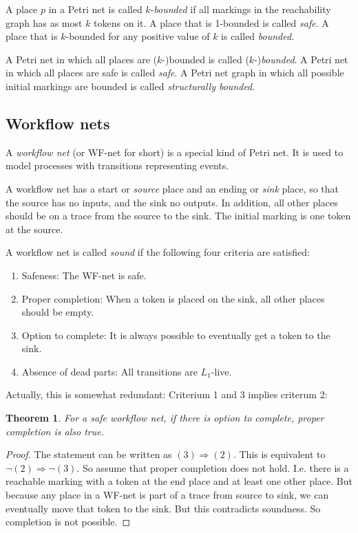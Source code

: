 \documentclass[12pt, a4paper]{article}
\newtheorem{theorem}{Theorem}[section]
\numberwithin{equation}{section}
\begin{document}
A place $p$ in a Petri net is called $k$-\textit{bounded} if all markings in the reachability graph has as most $k$ tokens on it. A place that is 1-bounded is called \textit{safe}. A place that is $k$-bounded for any positive value of $k$ is called \textit{bounded}.

A Petri net in which all places are ($k$-)bounded is called  ($k$-)\textit{bounded}. A Petri net in which all places are safe is called \textit{safe}. A Petri net graph in which all possible initial markings are bounded is called \textit{structurally bounded}.

\subsection{Workflow nets}
A \textit{workflow net} (or WF-net for short) is a special kind of Petri net. It is used to model processes with transitions representing events.

A workflow net has a start or \textit{source} place and an ending or \textit{sink} place, so that the source has no inputs, and the sink no outputs. In addition, all other places should be on a trace from the source to the sink. The initial marking is one token at the source.

A workflow net is called \textit{sound} if the following four criteria are satisfied:
\begin{enumerate}
\item Safeness: The WF-net is safe.
\item Proper completion: When a token is placed on the sink, all other places should be empty.
\item Option to complete: It is always possible to eventually get a token to the sink.
\item Absence of dead parts: All transitions are $L_1$-live.
\end{enumerate}
Actually, this is somewhat redundant: Criterium 1 and 3 implies criterum 2:

\begin{theorem}
For a safe workflow net, if there is option to complete, proper completion is also true.
\end{theorem}
\begin{proof}
The statement can be written as $(3)\Rightarrow(2)$. This is equivalent to $\neg (2)\Rightarrow\neg (3)$. So assume that proper completion does not hold. I.e. there is a reachable marking with a token at the end place and at least one other place. But because any place in a WF-net is part of a trace from source to sink, we can eventually move that token to the sink. But this contradicts soundness. So completion is not possible.
\end{proof}
\end{document}
